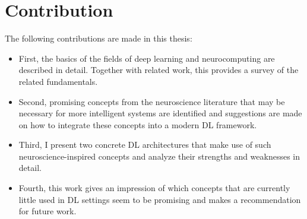 



\section{Contribution}
The following contributions are made in this thesis:
\begin{itemize}
	\item First, the basics of the fields of deep learning and neurocomputing are described in detail. Together with related work, this provides a survey of the related fundamentals.
	\item Second, promising concepts from the neuroscience literature that may be necessary for more intelligent systems are identified and suggestions are made on how to integrate these concepts into a modern DL framework.
	\item Third, I present two concrete DL architectures that make use of such neuroscience-inspired concepts and analyze their strengths and weaknesses in detail.
	\item Fourth, this work gives an impression of which concepts that are currently little used in DL settings seem to be promising and makes a recommendation for future work.
\end{itemize}

